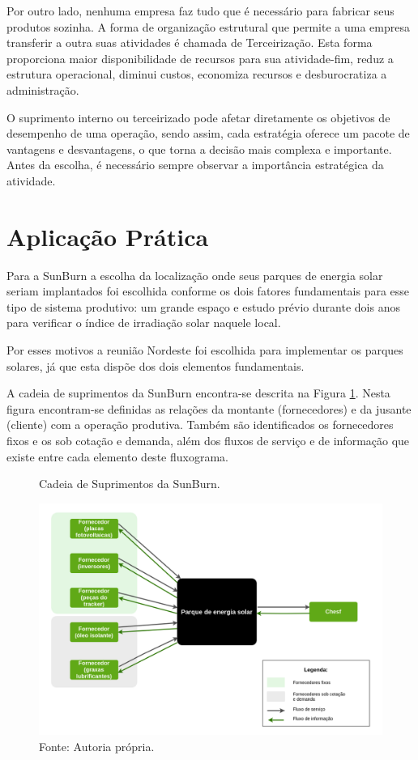 Por outro lado, nenhuma empresa faz tudo que é necessário para fabricar seus produtos sozinha. A forma de organização estrutural que permite a uma empresa transferir a outra suas atividades é chamada de Terceirização. Esta forma proporciona maior disponibilidade de recursos para sua atividade-fim, reduz a estrutura operacional, diminui custos, economiza recursos e desburocratiza a administração.

\par O suprimento interno ou terceirizado pode afetar diretamente os objetivos de desempenho de uma operação, sendo assim, cada estratégia oferece um pacote de vantagens e desvantagens, o que torna a decisão mais complexa e importante. Antes da escolha, é necessário sempre observar a importância estratégica da atividade. 


\section{Aplicação Prática} 
\label{sec:projetos_de_novas_aplicacao}
Para a SunBurn a escolha da localização onde seus parques de energia solar seriam implantados foi escolhida conforme os dois fatores fundamentais para esse tipo de sistema produtivo: um grande espaço e estudo prévio durante dois anos para verificar o índice de irradiação solar naquele local. 
\par Por esses motivos a reunião Nordeste foi escolhida para implementar os parques solares, já que esta dispõe dos dois elementos fundamentais.

\par A cadeia de suprimentos da SunBurn encontra-se descrita na Figura \ref{fig:cadeia_suprimentos_sunburn}. Nesta figura encontram-se definidas as relações da montante (fornecedores) e da jusante (cliente) com a operação produtiva. Também são identificados os fornecedores fixos e os sob cotação e demanda, além dos fluxos de serviço e de informação que existe entre cada elemento deste fluxograma. 


\begin{figure}[H]
    \centering
    \caption{Cadeia de Suprimentos da SunBurn.}
    \includegraphics[width = \textwidth]{images/cadeia_suprimentos_sunburn.png}
    \caption*{Fonte: Autoria própria.}
    \label{fig:cadeia_suprimentos_sunburn}
\end{figure}
  

